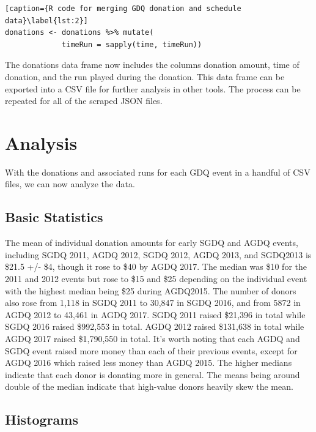 \documentclass[journal]{IEEEtran}
\begin{document}
\begin{lstlisting}[caption={R code for merging GDQ donation and schedule data}\label{lst:2}]
donations <- donations %>% mutate(
             timeRun = sapply(time, timeRun))
\end{lstlisting}

The donations data frame now includes the columns donation amount, time of donation, and the run played during the donation. This data frame can be exported into a CSV file for further analysis in other tools. The process can be repeated for all of the scraped JSON files.

\section{Analysis}

With the donations and associated runs for each GDQ event in a handful of CSV files, we can now analyze the data.

\subsection{Basic Statistics}

The mean of individual donation amounts for early SGDQ and AGDQ events, including SGDQ 2011, AGDQ 2012, SGDQ 2012, AGDQ 2013, and SGDQ2013 is \$21.5 +/- \$4, though it rose to \$40 by AGDQ 2017. The median was \$10 for the 2011 and 2012 events but rose to \$15 and \$25 depending on the individual event with the highest median being \$25 during AGDQ2015. The number of donors also rose from 1,118 in SGDQ 2011 to 30,847 in SGDQ 2016, and from 5872 in AGDQ 2012 to 43,461 in AGDQ 2017. SGDQ 2011 raised \$21,396 in total while SGDQ 2016 raised \$992,553 in total. AGDQ 2012 raised \$131,638 in total while AGDQ 2017 raised \$1,790,550 in total. It's worth noting that each AGDQ and SGDQ event raised more money than each of their previous events, except for AGDQ 2016 which raised less money than AGDQ 2015. The higher medians indicate that each donor is donating more in general. The means being around double of the median indicate that high-value donors heavily skew the mean.

\subsection{Histograms}
\end{document}
